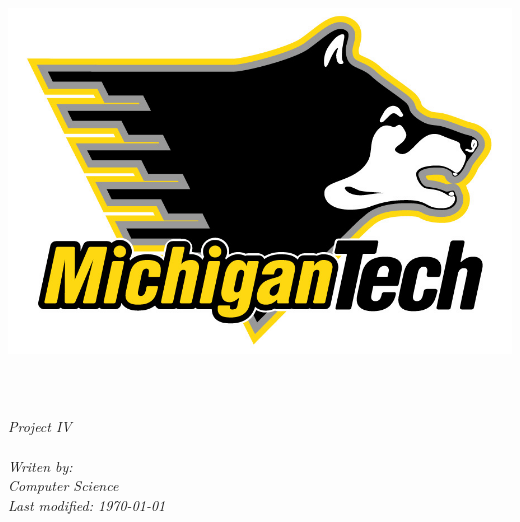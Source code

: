 \documentclass[11pt, a4paper, oneside]{Thesis}
\begin{document}
\begin{titlepage}
\begin{center}

\includegraphics{logo.jpg}\\[1cm] %
\textsc{\LARGE \univname}\\[1.5cm] %
\HRule \\[1.0cm] %
{\huge \bfseries \ttitle}\\[0.4cm] %

\huge \textit {Project IV}\\[0.1cm] %
\HRule \\[1.5cm] %

\small \textit{Writen by: \authornames}\\[0.5cm] %
\textit{Computer Science}\\[2cm] %
\textit{\large Last modified: \today}\\[4cm] %

 
\vfill
\end{center}

\end{titlepage}


\clearpage %


\pagestyle{empty} %
\end{document}
